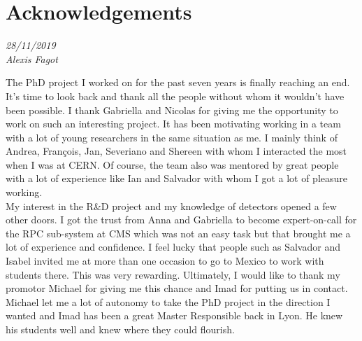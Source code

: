 \documentclass[10pt,a4paper,twoside,dutch,english,openright,leqno]{book}
\begin{document}
\baselineskip 13.0pt









\newpage




\renewcommand{\thesection}{\arabic{section}}
\renewcommand\evenpagerightmark{{\scshape\small Acknowledgements}}
\renewcommand\oddpageleftmark{{\scshape\small Acknowledgements}}
\chapter{Acknowledgements}
\vspace{0.35in}

\begin{flushright}{\emph{28/11/2019\\
Alexis Fagot}}
\end{flushright}

	The PhD project I worked on for the past seven years is finally reaching an end. It's time to look back and thank all the people without whom it wouldn't have been possible. I thank Gabriella and Nicolas for giving me the opportunity to work on such an interesting project. It has been motivating working in a team with a lot of young researchers in the same situation as me. I mainly think of Andrea, François, Jan, Severiano and Shereen with whom I interacted the most when I was at CERN. Of course, the team also was mentored by great people with a lot of experience like Ian and Salvador with whom I got a lot of pleasure working.\\
	My interest in the R\&D project and my knowledge of detectors opened a few other doors. I got the trust from Anna and Gabriella to become expert-on-call for the RPC sub-system at CMS which was not an easy task but that brought me a lot of experience and confidence. I feel lucky that people such as Salvador and Isabel invited me at more than one occasion to go to Mexico to work with students there. This was very rewarding. Ultimately, I would like to thank my promotor Michael for giving me this chance and Imad for putting us in contact. Michael let me a lot of autonomy to take the PhD project in the direction I wanted and Imad has been a great Master Responsible back in Lyon. He knew his students well and knew where they could flourish.\\
	
\end{document}
